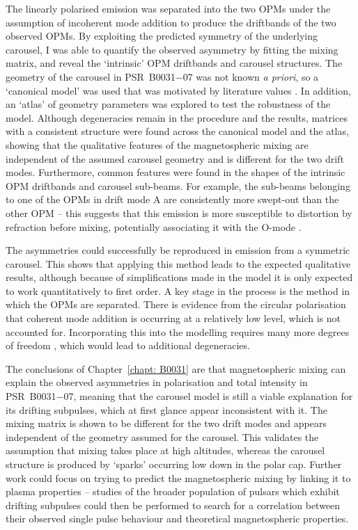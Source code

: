 The linearly polarised emission was separated into the two OPMs under the assumption of incoherent mode addition \citep{MSxx2000} to produce the driftbands of the two observed OPMs. By exploiting the predicted symmetry of the underlying carousel, I was able to quantify the observed asymmetry by fitting the mixing matrix, and reveal the `intrinsic' OPM driftbands and carousel structures. The geometry of the carousel in PSR~B0031$-$07 was not known \textit{a priori}, so a `canonical model' was used that was motivated by literature values \citep{SMS+2007,MBW+2019}. In addition, an `atlas' of geometry parameters was explored to test the robustness of the model. Although degeneracies remain in the procedure and the results, matrices with a consistent structure were found across the canonical model and the atlas, showing that the qualitative features of the magnetospheric mixing are independent of the assumed carousel geometry and is different for the two drift modes. Furthermore, common features were found in the shapes of the intrinsic OPM driftbands and carousel sub-beams. For example, the sub-beams belonging to one of the OPMs in drift mode A are consistently more swept-out than the other OPM -- this suggests that this emission is more susceptible to distortion by refraction before mixing, potentially associating it with the O-mode \citep{ABxx1986}. 

The asymmetries could successfully be reproduced in emission from a symmetric carousel. This shows that applying this method leads to the expected qualitative results, although because of simplifications made in the model it is only expected to work quantitatively to first order. A key stage in the process is the method in which the OPMs are separated. There is evidence from the circular polarisation that coherent mode addition is occurring at a relatively low level, which is not accounted for. Incorporating this into the modelling requires many more degrees of freedom \citep[e.g.][]{Dxxx2017}, which would lead to additional degeneracies.

The conclusions of Chapter~\ref{chapt: B0031} are that magnetospheric mixing can explain the observed asymmetries in polarisation and total intensity in PSR~B0031$-$07, meaning that the carousel model is still a viable explanation for its drifting subpulses, which at first glance appear inconsistent with it. The mixing matrix is shown to be different for the two drift modes and appears independent of the geometry assumed for the carousel. This validates the assumption that mixing takes place at high altitudes, whereas the carousel structure is produced by `sparks' occurring low down in the polar cap. Further work could focus on trying to predict the magnetospheric mixing by linking it to plasma properties -- studies of the broader population of pulsars which exhibit drifting subpulses could then be performed to search for a correlation between their observed single pulse behaviour and theoretical magnetospheric properties.







